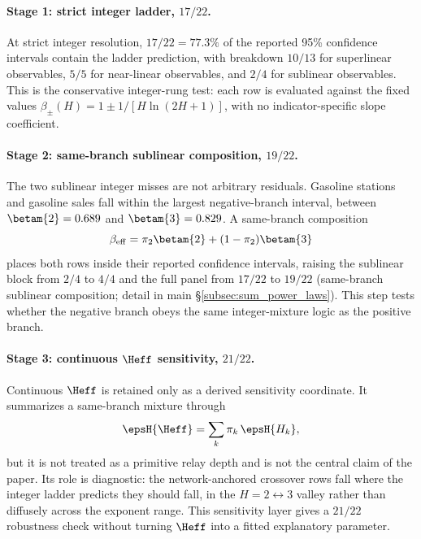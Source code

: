 \paragraph{Stage 1: strict integer ladder, \(17/22\).}
At strict integer resolution, \(17/22=77.3\%\) of the reported 95\%
confidence intervals contain the ladder prediction, with breakdown \(10/13\)
for superlinear observables, \(5/5\) for near-linear observables, and \(2/4\)
for sublinear observables. This is the conservative integer-rung test:
each row is evaluated against the fixed values
\(\beta_{\pm}(H)=1\pm1/[H\ln(2H+1)]\), with no indicator-specific slope
coefficient.

\paragraph{Stage 2: same-branch sublinear composition, \(19/22\).}
The two sublinear integer misses are not arbitrary residuals. Gasoline
stations and gasoline sales fall within the largest negative-branch interval,
between \(\betam{2}=0.689\) and \(\betam{3}=0.829\). A same-branch
composition
\[
\beta_{\mathrm{eff}}
 = \pi_2\betam{2}+(1-\pi_2)\betam{3}
\]
places both rows inside their reported confidence intervals, raising the
sublinear block from \(2/4\) to \(4/4\) and the full panel from \(17/22\)
to \(19/22\) (same-branch sublinear composition; detail in main \S\ref{subsec:sum_power_laws}). This step tests
whether the negative branch obeys the same integer-mixture logic as the
positive branch.

\paragraph{Stage 3: continuous \(\Heff\) sensitivity, \(21/22\).}
Continuous \(\Heff\) is retained only as a derived sensitivity coordinate.
It summarizes a same-branch mixture through
\[
\epsH{\Heff}=\sum_k\pi_k\,\epsH{H_k},
\]
but it is not treated as a primitive relay depth and is not the central
claim of the paper. Its role is diagnostic: the network-anchored crossover
rows fall where the integer ladder predicts they should fall, in the
\(H=2\leftrightarrow3\) valley rather than diffusely across the exponent
range. This sensitivity layer gives a \(21/22\) robustness check without
turning \(\Heff\) into a fitted explanatory parameter.

